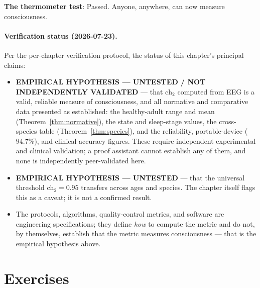 \textbf{The thermometer test}: Passed. Anyone, anywhere, can now measure consciousness.

\paragraph{Verification status (2026-07-23).}
Per the per-chapter verification protocol, the status of this chapter's principal claims:
\begin{itemize}
\item \textbf{EMPIRICAL HYPOTHESIS --- UNTESTED / NOT INDEPENDENTLY VALIDATED} --- that $\text{ch}_2$ computed from EEG is a valid, reliable measure of consciousness, and all normative and comparative data presented as established: the healthy-adult range and mean (Theorem~\ref{thm:normative}), the state and sleep-stage values, the cross-species table (Theorem~\ref{thm:species}), and the reliability, portable-device ($94.7\%$), and clinical-accuracy figures. These require independent experimental and clinical validation; a proof assistant cannot establish any of them, and none is independently peer-validated here.
\item \textbf{EMPIRICAL HYPOTHESIS --- UNTESTED} --- that the universal threshold $\text{ch}_2 = 0.95$ transfers across ages and species. The chapter itself flags this as a caveat; it is not a confirmed result.
\item The protocols, algorithms, quality-control metrics, and software are engineering specifications; they define \emph{how} to compute the metric and do not, by themselves, establish that the metric measures consciousness --- that is the empirical hypothesis above.
\end{itemize}

\section*{Exercises}

